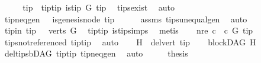 \begin{isabellebody}
%
\isadelimproof
%
\endisadelimproof
%
\isatagproof
{}\isamarkupfalse%
\ {\isacharminus}{\kern0pt}\isanewline
\ \ \isamarkupfalse%
\ tip\ \ tip{\isacharunderscore}{\kern0pt}tip{\isacharcolon}{\kern0pt}\ {\isachardoublequoteopen}is{\isacharunderscore}{\kern0pt}tip\ G\ tip{\isachardoublequoteclose}\ \isamarkupfalse%
\ tips{\isacharunderscore}{\kern0pt}exist\ \isamarkupfalse%
\ auto\isanewline
\ \ \isamarkupfalse%
\ \isamarkupfalse%
\ tip{\isacharunderscore}{\kern0pt}neq{\isacharunderscore}{\kern0pt}gen{\isacharcolon}{\kern0pt}\ {\isachardoublequoteopen}\ {\isasymnot}\ is{\isacharunderscore}{\kern0pt}genesis{\isacharunderscore}{\kern0pt}node\ tip{\isachardoublequoteclose}\isanewline
\ \ \ \ \isamarkupfalse%
\ assms\ tips{\isacharunderscore}{\kern0pt}unequal{\isacharunderscore}{\kern0pt}gen\ \isamarkupfalse%
\ auto\isanewline
\ \ \isamarkupfalse%
\ tip{\isacharunderscore}{\kern0pt}in{\isacharcolon}{\kern0pt}\ {\isachardoublequoteopen}tip\ \ {\isasymin}\ verts\ G{\isachardoublequoteclose}\ \isamarkupfalse%
\ tip{\isacharunderscore}{\kern0pt}tip\ is{\isacharunderscore}{\kern0pt}tip{\isachardot}{\kern0pt}simps\ \isamarkupfalse%
\ metis\isanewline
\ \ \isamarkupfalse%
\ nre{\isacharcolon}{\kern0pt}\ {\isachardoublequoteopen}{\isacharparenleft}{\kern0pt}{\isasymforall}c{\isachardot}{\kern0pt}\ {\isasymnot}\ c\ {\isasymrightarrow}\isactrlsup {\isacharplus}{\kern0pt}\isactrlbsub G\isactrlesub \ tip{\isacharparenright}{\kern0pt}{\isachardoublequoteclose}\ \isamarkupfalse%
\ tips{\isacharunderscore}{\kern0pt}not{\isacharunderscore}{\kern0pt}referenced\ tip{\isacharunderscore}{\kern0pt}tip\ \isamarkupfalse%
\ auto\isanewline
\ \ \isamarkupfalse%
\ {\isacharquery}{\kern0pt}H\ {\isacharequal}{\kern0pt}\ {\isachardoublequoteopen}del{\isacharunderscore}{\kern0pt}vert\ tip{\isachardoublequoteclose}\isanewline
\ \ \isamarkupfalse%
\ {\isachardoublequoteopen}blockDAG\ {\isacharquery}{\kern0pt}H{\isachardoublequoteclose}\ \isamarkupfalse%
\ del{\isacharunderscore}{\kern0pt}tips{\isacharunderscore}{\kern0pt}bDAG\ tip{\isacharunderscore}{\kern0pt}tip\ tip{\isacharunderscore}{\kern0pt}neq{\isacharunderscore}{\kern0pt}gen\ \isamarkupfalse%
\ auto\isanewline
\ \ \isamarkupfalse%
\ \isamarkupfalse%
\ {\isacharquery}{\kern0pt}thesis\ \isamarkupfalse%

\end{isabellebody}
